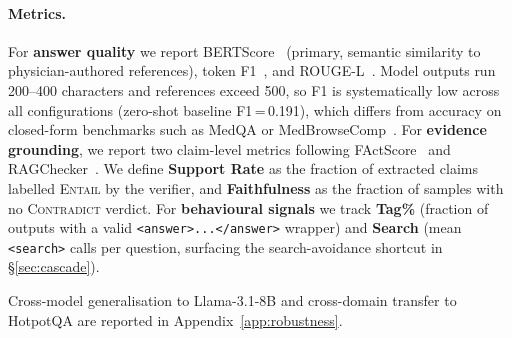 \documentclass[11pt]{article}
\begin{document}
\paragraph{Metrics.}
For \textbf{answer quality} we report
BERTScore~\citep{zhang2019bertscore} (primary, semantic
similarity to physician-authored references),
token F1~\citep{rajpurkar2016squad}, and
ROUGE-L~\citep{lin2004rouge}. Model outputs run
200--400 characters and references exceed 500, so F1 is
systematically low across all configurations (zero-shot
baseline F1\,=\,0.191), which differs from accuracy on
closed-form benchmarks such as MedQA or
MedBrowseComp~\citep{lu2025med,chen2025medbrowsecomp}.
For \textbf{evidence grounding}, we report two
claim-level metrics following
FActScore~\citep{min2023factscore} and
RAGChecker~\citep{ru2024ragchecker}. We define
\textbf{Support Rate} as the fraction of extracted
claims labelled \textsc{Entail} by the verifier, and
\textbf{Faithfulness} as the fraction of samples with
no \textsc{Contradict} verdict.
For \textbf{behavioural signals} we track \textbf{Tag\%}
(fraction of outputs with a valid
\texttt{<answer>...</answer>} wrapper) and
\textbf{Search} (mean \texttt{<search>} calls per
question, surfacing the search-avoidance shortcut in
\S\ref{sec:cascade}).

Cross-model generalisation to Llama-3.1-8B and 
cross-domain transfer to HotpotQA are reported in 
Appendix~\ref{app:robustness}.


\end{document}
